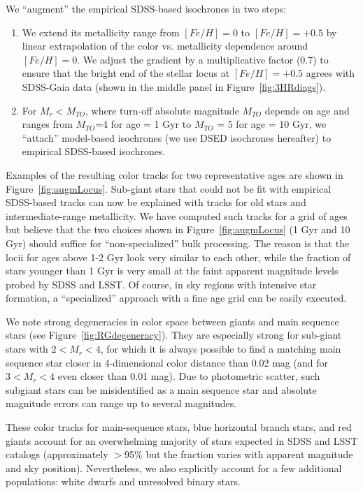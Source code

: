 We ``augment'' the empirical SDSS-based isochrones in two steps:
\begin{enumerate}
\item We extend its metallicity range from $[Fe/H]=0$ to $[Fe/H]=+0.5$ by linear extrapolation of the color vs. metallicity
  dependence around $[Fe/H]=0$. We adjust the gradient by a multiplicative factor (0.7) to ensure that the bright end of the
  stellar locus at $[Fe/H]=+0.5$ agrees with SDSS-Gaia data (shown in the middle panel in Figure~\ref{fig:3HRdiags}).
\item 
  For $M_r < M_{TO}$, where turn-off absolute magnitude $M_{TO}$ depends on age and ranges from $M_{TO}$=4 for age = 1 Gyr
  to $M_{TO}$ = 5 for age = 10 Gyr, we ``attach'' model-based isochrones (we use DSED isochrones hereafter) to empirical
  SDSS-based isochrones.
\end{enumerate}

Examples of the resulting color tracks for two representative ages are shown in Figure~\ref{fig:augmLocus}. Sub-giant stars that could not
be fit with empirical SDSS-based tracks can now be explained with tracks for old stars and intermediate-range metallicity. 
We have computed such tracks for a grid of ages but believe that the two choices shown in Figure~\ref{fig:augmLocus}
(1 Gyr and 10 Gyr) should suffice for ``non-specialized'' bulk processing. The reason is that the locii for ages above 1-2 Gyr look
very similar to each other, while the fraction of stars younger than 1 Gyr is very small at the faint apparent magnitude
levels probed by SDSS and LSST. Of course, in sky regions with intensive star formation, a ``specialized'' approach with
a fine age grid can be easily executed.

We note strong degeneracies in color space between giants and main sequence stars (see Figure~\ref{fig:RGdegeneracy}). 
They are especially strong for sub-giant stars with $2 < M_r < 4$, for which it is always possible to find a matching main sequence star
closer in 4-dimensional color distance than 0.02 mag (and for $3 < M_r < 4$ even closer than 0.01 mag). Due to photometric scatter, 
such subgiant stars can be misidentified as a main sequence star and absolute magnitude errors can range up to several magnitudes.


These color tracks for main-sequence stars,  blue horizontal branch stars, and red giants account for an overwhelming majority of stars 
expected in SDSS and LSST catalogs (approximately $>$95\% but the fraction varies with apparent magnitude and sky position). 
Nevertheless, we also explicitly account for a few additional populations: white dwarfs and unresolved binary stars. 


